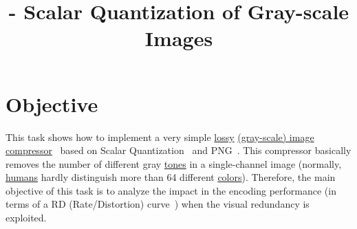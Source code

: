 

\title{\SM{} - Scalar Quantization of Gray-scale Images}

\maketitle
\tableofcontents

\section{Objective}
This task shows how to implement a very simple
\href{https://en.wikipedia.org/wiki/Lossy_compression}{lossy}
\href{https://en.wikipedia.org/wiki/Grayscale}{(gray-scale) image}
\href{https://en.wikipedia.org/wiki/Image_compression}{compressor}~\cite{vruiz__image_IO}
based on Scalar
Quantization~\cite{vruiz__scalar_quantization,sayood2017introduction,vetterli2014foundations}
and PNG~\cite{vruiz__PNG}. This compressor basically removes the
number of different gray
\href{https://en.wikipedia.org/w/index.php?title=Tone_(color)&redirect=no}{tones}
in a single-channel image (normally,
\href{https://en.wikipedia.org/wiki/Visual_system}{humans} hardly
distinguish more than 64 different
\href{https://en.wikipedia.org/wiki/Color}{colors}). Therefore, the
main objective of this task is to analyze the impact in the encoding
performance (in terms of a RD (Rate/Distortion)
curve~\cite{vruiz__information_theory}) when the visual redundancy is
exploited.

